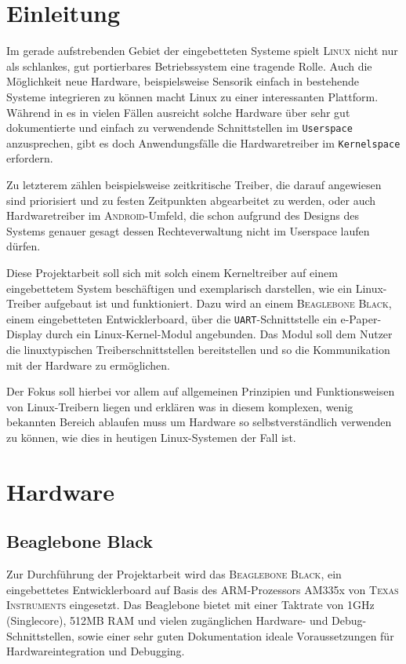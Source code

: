 
\chapter{Einleitung}
Im gerade aufstrebenden Gebiet der eingebetteten Systeme spielt \textsc{Linux} nicht nur als schlankes, gut portierbares Betriebssystem eine tragende Rolle. Auch die Möglichkeit neue Hardware, beispielsweise Sensorik einfach in bestehende Systeme integrieren zu können macht Linux zu einer interessanten Plattform. 
Während in es in vielen Fällen ausreicht solche Hardware über sehr gut dokumentierte und einfach zu verwendende Schnittstellen im \texttt{Userspace} anzusprechen, gibt es doch Anwendungsfälle die Hardwaretreiber im \texttt{Kernelspace} erfordern. 

Zu letzterem zählen beispielsweise zeitkritische Treiber, die darauf angewiesen sind priorisiert und zu festen Zeitpunkten abgearbeitet zu werden, oder auch Hardwaretreiber im \textsc{Android}-Umfeld, die schon aufgrund des Designs des Systems genauer gesagt dessen Rechteverwaltung nicht im Userspace laufen dürfen. \newline

Diese Projektarbeit soll sich mit solch einem Kerneltreiber auf einem eingebettetem System beschäftigen und exemplarisch darstellen, wie ein Linux-Treiber aufgebaut ist und funktioniert. Dazu wird an einem \textsc{Beaglebone Black}, einem eingebetteten Entwicklerboard, über die \texttt{UART}-Schnittstelle ein e-Paper-Display durch ein Linux-Kernel-Modul angebunden. Das Modul soll dem Nutzer die linuxtypischen Treiberschnittstellen bereitstellen und so die Kommunikation mit der Hardware zu ermöglichen.

Der Fokus soll hierbei vor allem auf allgemeinen Prinzipien und Funktionsweisen von Linux-Treibern liegen und erklären was in diesem komplexen, wenig bekannten Bereich ablaufen muss um Hardware so selbstverständlich verwenden zu können, wie dies in heutigen Linux-Systemen der Fall ist. 

\chapter{Hardware}

\section{Beaglebone Black}
Zur Durchführung der Projektarbeit wird das \textsc{Beaglebone Black}, ein eingebettetes Entwicklerboard auf Basis des ARM-Prozessors AM335x von \textsc{Texas Instruments} eingesetzt. Das Beaglebone bietet mit einer Taktrate von 1GHz (Singlecore), 512MB RAM und vielen zugänglichen Hardware- und Debug-Schnittstellen, sowie einer sehr guten Dokumentation ideale Voraussetzungen für Hardwareintegration und Debugging. 

